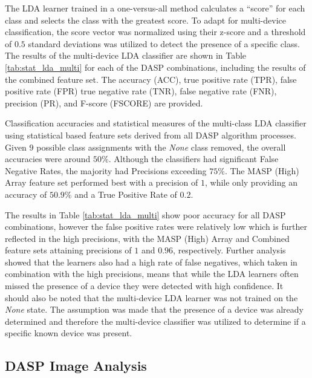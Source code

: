 The LDA learner trained in a one-versus-all method calculates a ``score'' for each class and selects the class with the greatest score.  To adapt for multi-device classification, the score vector was normalized using their z-score and a threshold of $0.5$ standard deviations was utilized to detect the presence of a specific class.  The results of the multi-device LDA classifier are shown in Table \ref{tab:stat_lda_multi} for each of the DASP combinations, including the results of the combined feature set.  The accuracy (ACC), true positive rate (TPR), false positive rate (FPR) true negative rate (TNR), false negative rate (FNR), precision (PR), and F-score (FSCORE) are provided. 

\begin{table}[tb]
	\caption{Classification accuracies and statistical measures of the multi-class LDA classifier using statistical based feature sets derived from all DASP algorithm processes.  Given $9$ possible class assignments with the \textit{None} class removed, the overall accuracies were around $50\%$.   Although the classifiers had significant False Negative Rates, the majority had Precisions exceeding $75\%$.  The MASP (High) Array feature set performed best with a precision of $1$, while only providing an accuracy of $50.9\%$ and a True Positive Rate of $0.2$.}
	\centering

	\label{tab:stat_lda_multi}
\end{table}

The results in Table \ref{tab:stat_lda_multi} show poor accuracy for all DASP combinations, however the false positive rates were relatively low which is further reflected in the high precisions, with the MASP (High) Array and Combined feature sets attaining precisions of $1$ and $0.96$, respectively.  Further analysis showed that the learners also had a high rate of false negatives, which taken in combination with the high precisions, means that while the LDA learners often missed the presence of a device they were detected with high confidence.  It should also be noted that the multi-device LDA learner was not trained on the \textit{None} state.  The assumption was made that the presence of a device was already determined and therefore the multi-device classifier was utilized to determine if a specific known device was present.

\subsection[DASP Image Analysis]{DASP Image Analysis}
\label{Convolutional Neural Network Multiple Device Classification}

